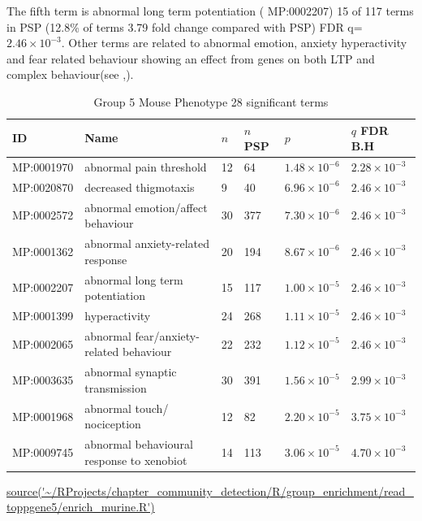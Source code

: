 The fifth term is  abnormal long term potentiation ( MP:0002207) 15 of 117 terms in PSP (12.8\% of terms 3.79 fold change compared with PSP) FDR q=$2.46 \times 10^{-3}$. Other terms are related to abnormal emotion, anxiety hyperactivity and fear related behaviour showing an effect from genes on both LTP and complex behaviour(see \cite{grant2018synaptomic},\cite{grant2019synapse}).







\begin{table}[ht]
\centering
\setlength{\extrarowheight}{2pt}
\begin{adjustbox}{width=\textwidth}
\begin{tabular}{llllll}
  \toprule
ID & Name &$n$ &$n$ PSP& $p$ & $q$ FDR B.H \\ 
  \midrule
MP:0001970 & abnormal pain threshold & 12 & 64 & $1.48 \times 10^{-6}$ & $2.28 \times 10^{-3}$ \\ 
  MP:0020870 & decreased thigmotaxis & 9 & 40 & $6.96 \times 10^{-6}$ & $2.46 \times 10^{-3}$ \\ 
  MP:0002572 & abnormal emotion/affect behaviour & 30 & 377 & $7.30 \times 10^{-6}$ & $2.46 \times 10^{-3}$ \\ 
  MP:0001362 & abnormal anxiety-related response & 20 & 194 & $8.67 \times 10^{-6}$ & $2.46 \times 10^{-3}$ \\ 
  MP:0002207 & abnormal long term potentiation & 15 & 117 & $1.00 \times 10^{-5}$ & $2.46 \times 10^{-3}$ \\ 
  MP:0001399 & hyperactivity & 24 & 268 & $1.11 \times 10^{-5}$ & $2.46 \times 10^{-3}$ \\ 
  MP:0002065 & abnormal fear/anxiety-related behaviour & 22 & 232 & $1.12 \times 10^{-5}$ & $2.46 \times 10^{-3}$ \\ 
  MP:0003635 & abnormal synaptic transmission & 30 & 391 & $1.56 \times 10^{-5}$ & $2.99 \times 10^{-3}$ \\ 
  MP:0001968 & abnormal touch/ nociception & 12 & 82 & $2.20 \times 10^{-5}$ & $3.75 \times 10^{-3}$ \\ 
  MP:0009745 & abnormal behavioural response to xenobiot & 14 & 113 & $3.06 \times 10^{-5}$ & $4.70 \times 10^{-3}$ \\ 
   \bottomrule
\end{tabular}
\end{adjustbox}
\caption{Group 5 Mouse Phenotype 28 significant terms}
\tiny\url{source('~/RProjects/chapter_community_detection/R/group_enrichment/read_toppgene5/enrich_murine.R')}
\label{tab:Group 5 Mouse Phenotype 28 significant terms}
\end{table}


